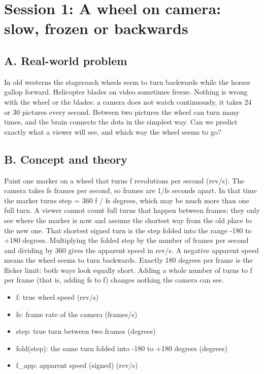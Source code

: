 \documentclass[11pt,a4paper]{article}
\begin{document}
\section{Session 1: A wheel on camera: slow, frozen or backwards}

\subsection*{A. Real-world problem}
In old westerns the stagecoach wheels seem to turn backwards while the horses gallop forward. Helicopter blades on video sometimes freeze. Nothing is wrong with the wheel or the blades: a camera does not watch continuously, it takes 24 or 30 pictures every second. Between two pictures the wheel can turn many times, and the brain connects the dots in the simplest way. Can we predict exactly what a viewer will see, and which way the wheel seems to go?

\subsection*{B. Concept and theory}
Paint one marker on a wheel that turns f revolutions per second (rev/s). The camera takes fs frames per second, so frames are 1/fs seconds apart. In that time the marker turns step = 360 f / fs degrees, which may be much more than one full turn. A viewer cannot count full turns that happen between frames; they only see where the marker is now and assume the shortest way from the old place to the new one. That shortest signed turn is the step folded into the range -180 to +180 degrees. Multiplying the folded step by the number of frames per second and dividing by 360 gives the apparent speed in rev/s. A negative apparent speed means the wheel seems to turn backwards. Exactly 180 degrees per frame is the flicker limit: both ways look equally short. Adding a whole number of turns to f per frame (that is, adding fs to f) changes nothing the camera can see.

\begin{itemize}[nosep]
\item f: true wheel speed (rev/s)
\item fs: frame rate of the camera (frames/s)
\item step: true turn between two frames (degrees)
\item fold(step): the same turn folded into -180 to +180 degrees (degrees)
\item f\_app: apparent speed (signed) (rev/s)
\end{itemize}
\end{document}
